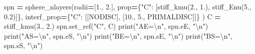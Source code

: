 \documentclass[
  a4paper,
  numbers=noendperiod,
  DIV=12]{scrreprt}
\newenvironment{Shaded}{\begin{snugshade}}{\end{snugshade}}
\newcommand{\BuiltInTok}[1]{#1}
\newcommand{\CharTok}[1]{\textcolor[rgb]{0.31,0.60,0.02}{#1}}
\newcommand{\FloatTok}[1]{\textcolor[rgb]{0.00,0.00,0.81}{#1}}
\newcommand{\NormalTok}[1]{#1}
\newcommand{\OperatorTok}[1]{\textcolor[rgb]{0.81,0.36,0.00}{\textbf{#1}}}
\newcommand{\StringTok}[1]{\textcolor[rgb]{0.31,0.60,0.02}{#1}}
\begin{document}
\begin{Shaded}
\begin{Highlighting}[]
\NormalTok{spn }\OperatorTok{=}\NormalTok{ sphere\_nlayers(radii}\OperatorTok{=}\NormalTok{[}\FloatTok{1.}\NormalTok{, }\FloatTok{2.}\NormalTok{],}
\NormalTok{                     prop}\OperatorTok{=}\NormalTok{\{}\StringTok{"C"}\NormalTok{: [stiff\_kmu(}\FloatTok{2.}\NormalTok{, }\FloatTok{1.}\NormalTok{), stiff\_Enu(}\FloatTok{5.}\NormalTok{, }\FloatTok{0.2}\NormalTok{)]\},}
\NormalTok{                     interf\_prop}\OperatorTok{=}\NormalTok{\{}\StringTok{"C"}\NormalTok{: [[NODISC], [}\FloatTok{10.}\NormalTok{, }\FloatTok{5.}\NormalTok{, PRIMALDISC]]\}}
\NormalTok{                    )}
\NormalTok{C }\OperatorTok{=}\NormalTok{ stiff\_kmu(}\FloatTok{3.}\NormalTok{, }\FloatTok{2.}\NormalTok{)}
\NormalTok{spn.set\_ref(}\StringTok{"C"}\NormalTok{, C)}
\BuiltInTok{print}\NormalTok{(}\StringTok{"AE=}\CharTok{\textbackslash{}n}\StringTok{"}\NormalTok{, spn.eE, }\StringTok{"}\CharTok{\textbackslash{}n}\StringTok{"}\NormalTok{)}
\BuiltInTok{print}\NormalTok{(}\StringTok{"AS=}\CharTok{\textbackslash{}n}\StringTok{"}\NormalTok{, spn.eS, }\StringTok{"}\CharTok{\textbackslash{}n}\StringTok{"}\NormalTok{)}
\BuiltInTok{print}\NormalTok{(}\StringTok{"BE=}\CharTok{\textbackslash{}n}\StringTok{"}\NormalTok{, spn.sE, }\StringTok{"}\CharTok{\textbackslash{}n}\StringTok{"}\NormalTok{)}
\BuiltInTok{print}\NormalTok{(}\StringTok{"BS=}\CharTok{\textbackslash{}n}\StringTok{"}\NormalTok{, spn.sS, }\StringTok{"}\CharTok{\textbackslash{}n}\StringTok{"}\NormalTok{)}
\end{Highlighting}
\end{Shaded}
\end{document}

